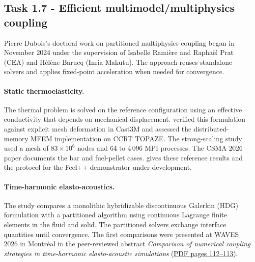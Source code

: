 \subsection{Task 1.7 -  Efficient multimodel/multiphysics coupling}
Pierre Dubois's doctoral work on partitioned multiphysics coupling began in
November 2024 under the supervision of Isabelle Ramière and Raphaël Prat
(CEA) and Hélène Barucq (Inria Makutu). The approach reuses standalone
solvers and applies fixed-point acceleration when needed for convergence.

\paragraph{Static thermoelasticity.}
The thermal problem is solved on the reference configuration using an
effective conductivity that depends on mechanical displacement.
 verified this formulation against explicit
mesh deformation in Cast3M and assessed the distributed-memory MFEM
implementation on CCRT TOPAZE. The strong-scaling study used a mesh
of $83\times10^6$ nodes and 64 to 4\,096 MPI processes. The CSMA 2026
paper documents the bar and fuel-pellet cases.
 gives these reference results
and the protocol for the Feel++ demonstrator under development.

\paragraph{Time-harmonic elasto-acoustics.}
The study compares a monolithic hybridizable discontinuous Galerkin
(HDG) formulation with a partitioned algorithm using continuous
Lagrange finite elements in the fluid and solid. The partitioned
solvers exchange interface quantities until convergence. The first
comparisons were presented at WAVES 2026 in Montréal in the
peer-reviewed abstract \emph{Comparison of numerical coupling strategies
in time-harmonic elasto-acoustic simulations}
\cite{imbert-gerardWaves2026Book2026}
(\href{https://arxiv.org/pdf/2607.19425\#page=112}{PDF pages 112--113}).

